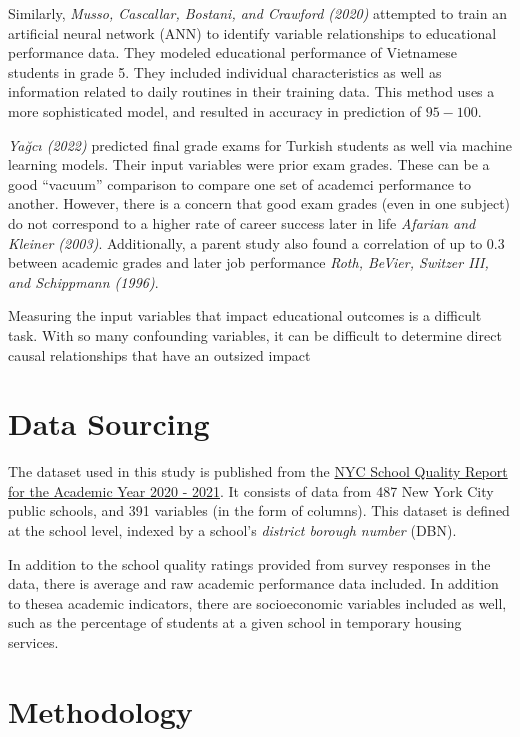 \documentclass[
  man]{apa6}
\begin{document}
Similarly, \emph{Musso, Cascallar, Bostani, and Crawford (2020)} attempted to train an artificial neural network (ANN) to identify variable relationships to educational performance data. They modeled educational performance of Vietnamese students in grade 5. They included individual characteristics as well as information related to daily routines in their training data. This method uses a more sophisticated model, and resulted in accuracy in prediction of \(95-100%
\).

\emph{Yağcı (2022)} predicted final grade exams for Turkish students as well via machine learning models. Their input variables were prior exam grades. These can be a good ``vacuum'' comparison to compare one set of academci performance to another. However, there is a concern that good exam grades (even in one subject) do not correspond to a higher rate of career success later in life \emph{Afarian and Kleiner (2003)}. Additionally, a parent study also found a correlation of up to 0.3 between academic grades and later job performance \emph{Roth, BeVier, Switzer III, and Schippmann (1996)}.

Measuring the input variables that impact educational outcomes is a difficult task. With so many confounding variables, it can be difficult to determine direct causal relationships that have an outsized impact

\hypertarget{data-sourcing}{%
\section{Data Sourcing}\label{data-sourcing}}

The dataset used in this study is published from the \href{https://data.cityofnewyork.us/Education/2020-2021-School-Quality-Reports-High-School/26je-vkp6}{NYC School Quality Report for the Academic Year 2020 - 2021}. It consists of data from 487 New York City public schools, and 391 variables (in the form of columns). This dataset is defined at the school level, indexed by a school's \emph{district borough number} (DBN).

In addition to the school quality ratings provided from survey responses in the data, there is average and raw academic performance data included. In addition to thesea academic indicators, there are socioeconomic variables included as well, such as the percentage of students at a given school in temporary housing services.

\hypertarget{methodology}{%
\section{Methodology}\label{methodology}}
\end{document}

